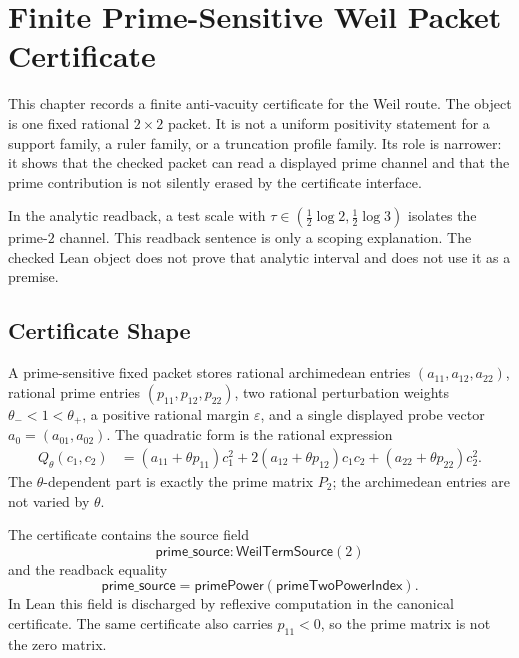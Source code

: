 \chapter{Finite Prime-Sensitive Weil Packet Certificate}
\label{ch:visions-rh-weil-prime-sensitive-packet}

This chapter records a finite anti-vacuity certificate for the Weil route.
The object is one fixed rational $2\times2$ packet. It is not a uniform
positivity statement for a support family, a ruler family, or a truncation
profile family. Its role is narrower: it shows that the checked packet can read a
displayed prime channel and that the prime contribution is not silently
erased by the certificate interface.

In the analytic readback, a test scale with
$\tau\in(\frac12\log2,\frac12\log3)$ isolates the prime-$2$ channel. This
readback sentence is only a scoping explanation. The checked Lean object
does not prove that analytic interval and does not use it as a premise.

\section{Certificate Shape}
\label{sec:rh-weil-prime-sensitive-certificate-shape}

\begin{definition}
\label{def:rh-weil-prime-sensitive-fixed-packet}
A prime-sensitive fixed packet stores rational archimedean entries
$(a_{11},a_{12},a_{22})$, rational prime entries
$(p_{11},p_{12},p_{22})$, two rational perturbation weights
$\theta_-<1<\theta_+$, a positive rational margin $\varepsilon$, and a
single displayed probe vector $a_0=(a_{01},a_{02})$. The quadratic form is
the rational expression
$$
\begin{aligned}
Q_{\theta}(c_1,c_2)
&=
(a_{11}+\theta p_{11})c_1^2
+2(a_{12}+\theta p_{12})c_1c_2
+(a_{22}+\theta p_{22})c_2^2 .
\end{aligned}
$$
The $\theta$-dependent part is exactly the prime matrix $P_2$; the
archimedean entries are not varied by $\theta$.
\end{definition}

\begin{definition}
\label{def:rh-weil-prime-source-readback}
The certificate contains the source field
$$
\mathsf{prime\_source}:\mathsf{WeilTermSource}(2)
$$
and the readback equality
$$
\mathsf{prime\_source}
=
\mathsf{primePower}(\mathsf{primeTwoPowerIndex}).
$$
In Lean this field is discharged by reflexive computation in the canonical
certificate. The same certificate also carries $p_{11}<0$, so the prime
matrix is not the zero matrix.
\end{definition}

